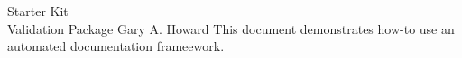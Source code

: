 \documentclass[10pt]{tlc-article}
\begin{document}
  \tlcTitlePageAndTableOfContents
    {Starter Kit \\ Validation Package}
    {Gary A. Howard}
    {This document demonstrates how-to use an automated documentation
      frameework.} 

  
\end{document}
